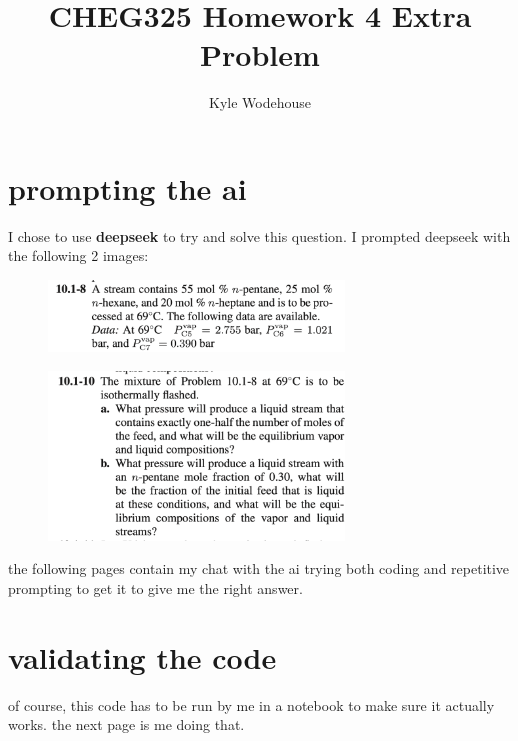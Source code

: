 \documentclass{article}
\title{\bfseries CHEG325 Homework 4 Extra Problem}
\author{Kyle Wodehouse}
\date{}
\begin{document}
\maketitle
\section{prompting the ai}
I chose to use \textbf{deepseek} to try and solve this question. I prompted deepseek with the following 2 images:

\begin{figure}[H]
    \centering
    \includegraphics[width=0.7\textwidth, frame]{img/1.png}
\end{figure}
\begin{figure}[H]
    \centering
    \includegraphics[width=0.7\textwidth, frame]{img/2.png}
\end{figure}

the following pages contain my chat with the ai trying both coding and repetitive prompting to get it to give me the right answer.



\eject \pdfpagewidth=8.5in \pdfpageheight=2in


\section{validating the code}

of course, this code has to be run by me in a notebook to make sure it actually works. the next page is me doing that.
\end{document}
